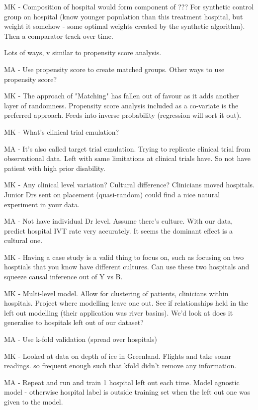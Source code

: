MK - Composition of hospital would form component of ???
For synthetic control group on hospital (know younger population than this treatment hospital, but weight it somehow - some optimal weights created by the synthetic algorithm). Then a comparator track over time.

Lots of ways, v similar to propensity score analysis.

MA - Use propensity score to create matched groups. Other ways to use propensity score?

MK - The approach of "Matching" has fallen out of favour as it adds another layer of randomness. Propensity score analysis included as a co-variate is the preferred approach. Feeds into inverse probability (regression will sort it out).

MK - What's clinical trial emulation?

MA - It's also called target trial emulation. Trying to replicate clinical trial from observational data. Left with same limitations at clinical trials have. So not have patient with high prior disability.

MK - Any clinical level variation? Cultural difference? Clinicians moved hospitals. Junior Drs sent on placement (quasi-random) could find a nice natural experiment in your data.

MA - Not have individual Dr level. Assume there's culture. With our data, predict hospital IVT rate very accurately. It seems the dominant effect is a cultural one.

MK - Having a case study is a valid thing to focus on, such as focusing on two hosptials that you know have different cultures. Can use these two hospitals and squeeze causal inference out of Y vs B.

MK - Multi-level model. Allow for clustering of patients, clinicians within hospitals. Project where modelling leave one out. See if relationships held in the left out modelling (their application was river basins). We'd look at does it generalise to hospitals left out of our dataset?

MA - Use k-fold validation (spread over hospitals)

MK - Looked at data on depth of ice in Greenland. Flights and take sonar readings. so frequent enough such that kfold didn't remove any information.

MA - Repeat and run and train 1 hospital left out each time. Model agnostic model - otherwise hospital label is outside training set when the left out one was given to the model.

